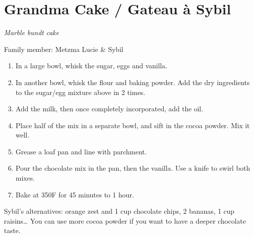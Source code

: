 \chapter{Grandma Cake / Gateau à Sybil}
\label{ch:grandma_cake}


\textit{Marble bundt cake}

Family member: Metzma Lucie \& Sybil

\begin{enumerate}
    \item In a large bowl, whisk the sugar, eggs and vanilla.
    \item In another bowl, whisk the flour and baking powder. Add the dry ingredients to the sugar/egg mixture above in 2 times.
    \item Add the milk, then once completely incorporated, add the oil.
    \item Place half of the mix in a separate bowl, and sift in the cocoa powder. Mix it well.
    \item Grease a loaf pan and line with parchment. 
    \item Pour the chocolate mix in the pan, then the vanilla. Use a knife to swirl both mixes.
    \item Bake at 350\degree F for 45 minutes to 1 hour.
\end{enumerate}

%


Sybil’s alternatives: orange zest and 1 cup chocolate chips, 2 bananas, 1 cup raisins… You can use more cocoa powder if you want to have a deeper chocolate taste.

